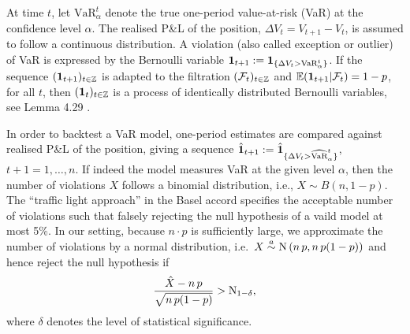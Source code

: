 \documentclass[square]{article} %
\theoremstyle{plain}
\theoremstyle{definition} %
\begin{document}
At time $t$, let $\text{VaR}_\alpha^t$ denote the true one-period 
value-at-risk (VaR) at the confidence level $\alpha$. The realised
P\&L of the position, $\Delta V_t=V_{t+1}-V_t$, is assumed to follow a
continuous distribution. %
A violation (also called exception or outlier) of VaR is expressed by
the Bernoulli variable 
$\textbf{1}_{t+1}:=\textbf{1}_{\{\Delta V_t>\text{VaR}_\alpha^t\}}$.
If the sequence $(\textbf{1}_{t+1})_{t\in {\mathbb Z}}$ is adapted 
to the filtration $(\mathcal F_t)_{t\in {\mathbb Z}}$ and ${\mathbb{E}}(\textbf{1}_{t+1}|\mathcal
F_t)=1-p$, for all $t$, then $(\textbf{1}_t)_{t\in {\mathbb Z}}$ is a process of 
identically distributed Bernoulli variables, see 
Lemma 4.29 \cite{McNeil2005}.


In order to backtest a VaR model, 
one-period estimates are 
compared against realised P\&L of the
position, giving a sequence $\hat{\textbf{1}}_{t+1}:=\hat{\textbf{1}}_{\{\Delta V_t >
  \widehat{\text{VaR}}_\alpha^t\}}$, $t+1=1, \ldots, n$. If indeed the
model measures VaR at the given level $\alpha$, then the number of
violations $X$ follows a binomial distribution, i.e., $X\sim
B(n,1-p)$. The ``traffic light approach'' in the Basel accord
specifies the acceptable number of violations such that falsely
rejecting the null hypothesis of a vaild model at most 5\%. In
our setting, because $n\cdot p$ is sufficiently large, we approximate
the number of violations by a normal distribution, i.e.\
$X\stackrel{a}{\sim} \displaystyle {\rm N}\left(n\, p, 
  n\, p(1-p)\right)$ and hence reject the null hypothesis if
\begin{equation*}
  \frac{\hat X-n\, p}{\sqrt{n\, p(1-p)}} > {\rm N}_{1-\delta},
\end{equation*}
where $\delta$ denotes the level of statistical significance. 





\clearpage
\end{document}
